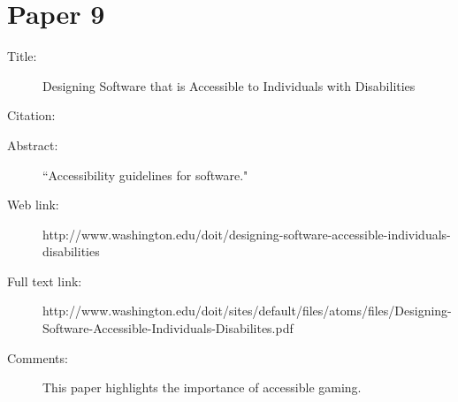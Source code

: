 \documentclass{scrartcl}
\begin{document}
\section*{Paper 9}
\begin{description}
\item[Title:] Designing Software that is Accessible to Individuals with Disabilities
\item[Citation:] \cite{doittwo}
\item[Abstract:] ``Accessibility guidelines for software."
\item[Web link:] http://www.washington.edu/doit/designing-software-accessible-individuals-disabilities
\item[Full text link:] http://www.washington.edu/doit/sites/default/files/atoms/files/Designing-Software-Accessible-Individuals-Disabilites.pdf
\item[Comments:] This paper highlights the importance of accessible gaming.
\end{description}
\end{document}
